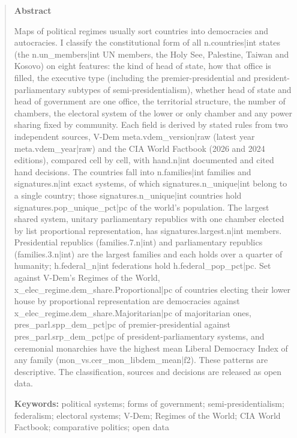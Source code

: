 \documentclass[11pt,a4paper]{article}
\begin{document}
\begin{quote}
\small
\begin{center}\textbf{Abstract}\end{center}
Maps of political regimes usually sort countries into democracies and autocracies. I classify the constitutional form of all {{n.countries|int}} states (the {{n.un_members|int}} UN members, the Holy See, Palestine, Taiwan and Kosovo) on eight features: the kind of head of state, how that office is filled, the executive type (including the premier-presidential and president-parliamentary subtypes of semi-presidentialism), whether head of state and head of government are one office, the territorial structure, the number of chambers, the electoral system of the lower or only chamber and any power sharing fixed by community. Each field is derived by stated rules from two independent sources, V-Dem {{meta.vdem_version|raw}} (latest year {{meta.vdem_year|raw}}) and the CIA World Factbook (2026 and 2024 editions), compared cell by cell, with {{hand.n|int}} documented and cited hand decisions. The countries fall into {{n.families|int}} families and {{signatures.n|int}} exact systems, of which {{signatures.n_unique|int}} belong to a single country; those {{signatures.n_unique|int}} countries hold {{signatures.pop_unique_pct|pc}} of the world's population. The largest shared system, unitary parliamentary republics with one chamber elected by list proportional representation, has {{signatures.largest.n|int}} members. Presidential republics ({{families.7.n|int}}) and parliamentary republics ({{families.3.n|int}}) are the largest families and each holds over a quarter of humanity; {{h.federal_n|int}} federations hold {{h.federal_pop_pct|pc}}. Set against V-Dem's Regimes of the World, {{x_elec_regime.dem_share.Proportional|pc}} of countries electing their lower house by proportional representation are democracies against {{x_elec_regime.dem_share.Majoritarian|pc}} of majoritarian ones, {{pres_parl.spp_dem_pct|pc}} of premier-presidential against {{pres_parl.srp_dem_pct|pc}} of president-parliamentary systems, and ceremonial monarchies have the highest mean Liberal Democracy Index of any family ({{mon_vs.cer_mon_libdem_mean|f2}}). These patterns are descriptive. The classification, sources and decisions are released as open data.

\textbf{Keywords:} political systems; forms of government; semi-presidentialism; federalism; electoral systems; V-Dem; Regimes of the World; CIA World Factbook; comparative politics; open data
\end{quote}
\end{document}
